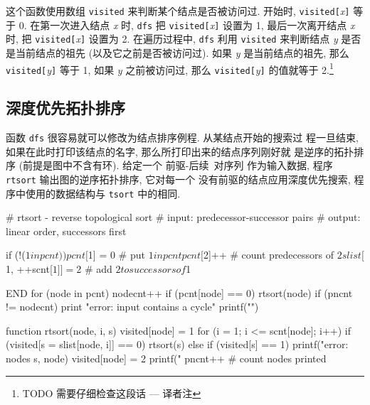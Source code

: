 这个函数使用数组 \texttt{visited} 来判断某个结点是否被访问过. 开始时,
\texttt{visited[}\textit{x}\texttt{]} 等于 0. 在第一次进入结点 \textit{x}
时, \texttt{dfs} 把 \texttt{visited[}\textit{x}\texttt{]} 设置为 1,
最后一次离开结点 \textit{x} 时, 把 \texttt{visited[}\textit{x}\texttt{]}
设置为 2. 在遍历过程中, \texttt{dfs} 利用 \texttt{visited} 来判断结点
\textit{y} 是否是当前结点的祖先 (以及它之前是否被访问过). 如果 \textit{y}
是当前结点的祖先, 那么 \texttt{visited[}\textit{y}\texttt{]} 等于 1,
如果 \textit{y} 之前被访问过, 那么 \texttt{visited[}\textit{y}\texttt{]} 
的值就等于 2.\footnote{TODO 需要仔细检查这段话 --- 译者注}

\subsection{深度优先拓扑排序}
\label{subsec:depth_first_topological_sort}

函数 \texttt{dfs} 很容易就可以修改为结点排序例程. 从某结点开始的搜索过
程一旦结束, 如果在此时打印该结点的名字, 那么所打印出来的结点序列刚好就
是逆序的拓扑排序 (前提是图中不含有环). 给定一个 \mbox{前驱}-后续\ 对序列
作为输入数据, 程序 \texttt{rtsort} 输出图的逆序拓扑排序, 它对每一个
没有前驱的结点应用深度优先搜索, 程序中使用的数据结构与 \texttt{tsort}
中的相同.
\begin{awkcode}
    # rtsort - reverse topological sort
    #   input:  predecessor-successor pairs
    #   output: linear order, successors first

        { if (!($1 in pcnt))
              pcnt[$1] = 0           # put $1 in pcnt
          pcnt[$2]++                 # count predecessors of $2
          slist[$1, ++scnt[$1]] = $2 # add $2 to successors of $1
        }

    END { for (node in pcnt) {
              nodecnt++
              if (pcnt[node] == 0)
                  rtsort(node)
          }
          if (pncnt != nodecnt)
              print "error: input contains a cycle"
          printf("\n")
        }

    function rtsort(node,     i, s) {
        visited[node] = 1
        for (i = 1; i <= scnt[node]; i++)
            if (visited[s = slist[node, i]] == 0)
                rtsort(s)
            else if (visited[s] == 1)
                printf("error: nodes %
                    s, node)
        visited[node] = 2
        printf(" %
        pncnt++    # count nodes printed
    }
\end{awkcode}

